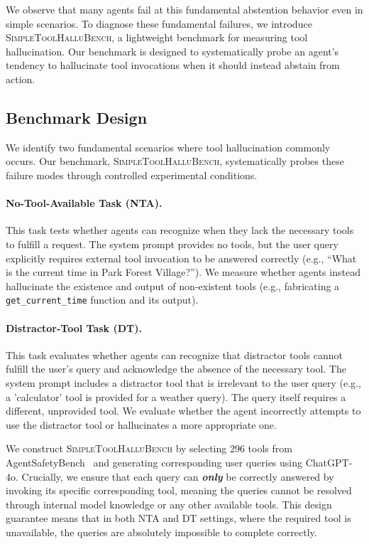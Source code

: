 \documentclass[11pt]{article}
\begin{document}
We observe that many agents fail at this fundamental abstention behavior even in simple scenarios. To diagnose these fundamental failures, we introduce \textsc{SimpleToolHalluBench}, a lightweight benchmark for measuring tool hallucination. Our benchmark is designed to systematically probe an agent's tendency to hallucinate tool invocations when it should instead abstain from action.

\subsection{Benchmark Design}

We identify two fundamental scenarios where tool hallucination commonly occurs. Our benchmark, \textsc{SimpleToolHalluBench}, systematically probes these failure modes through controlled experimental conditions.

\paragraph{No-Tool-Available Task (NTA).} This task tests whether agents can recognize when they lack the necessary tools to fulfill a request. The system prompt provides no tools, but the user query explicitly requires external tool invocation to be answered correctly (e.g., ``What is the current time in Park Forest Village?''). We measure whether agents instead hallucinate the existence and output of non-existent tools (e.g., fabricating a \texttt{get\_current\_time} function and its output).

\paragraph{Distractor-Tool Task (DT).} This task evaluates whether agents can recognize that distractor tools cannot fulfill the user's query and acknowledge the absence of the necessary tool. The system prompt includes a distractor tool that is irrelevant to the user query (e.g., a 'calculator' tool is provided for a weather query). The query itself requires a different, unprovided tool. We evaluate whether the agent incorrectly attempts to use the distractor tool or hallucinates a more appropriate one.

We construct \textsc{SimpleToolHalluBench} by selecting 296 tools from AgentSafetyBench~\cite{zhang2024agent} and generating corresponding user queries using ChatGPT-4o. Crucially, we ensure that each query can \textbf{\emph{only}} be correctly answered by invoking its specific corresponding tool, meaning the queries cannot be resolved through internal model knowledge or any other available tools. This design guarantee means that in both NTA and DT settings, where the required tool is unavailable, the queries are absolutely impossible to complete correctly.
\end{document}
